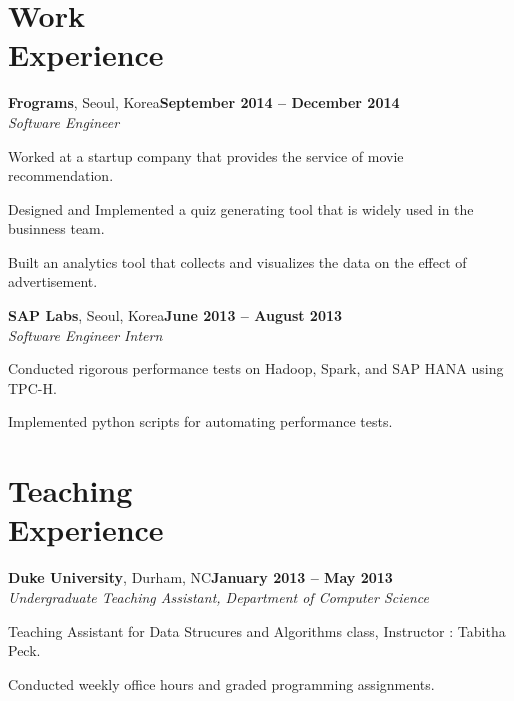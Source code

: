 \documentclass[11pt,margin,line]{cv}
\begin{document}
\begin{resume}
    \section{\mysidestyle Work\\Experience}
    \textbf{Frograms}, Seoul, Korea\hfill \textbf{September 2014 -- December 2014} \vspace{1mm}\\\vspace{0mm}%
    \textsl{Software Engineer}
    \vspace{-2mm}\\\vspace{-1mm}%
    \begin{list3}
        \item Worked at a startup company that provides the service of movie recommendation.
        \item Designed and Implemented a quiz generating tool that is widely used in the businness team.
        \item Built an analytics tool that collects and visualizes the data on the effect of advertisement.
    \end{list3}

    \textbf{SAP Labs}, Seoul, Korea\hfill \textbf{June 2013 -- August 2013} \vspace{1mm}\\\vspace{0mm}%
    \textsl{Software Engineer Intern}
    \vspace{-2mm}\\\vspace{-1mm}%
    \begin{list3}
        \item Conducted rigorous performance tests on Hadoop, Spark, and SAP HANA using TPC-H.
        \item Implemented python scripts for automating performance tests.
    \end{list3}


    \section{\mysidestyle Teaching\\Experience}
    \textbf{Duke University}, Durham, NC\hfill \textbf{January 2013 -- May 2013} \vspace{1mm}\\\vspace{0mm}%
    \textsl{Undergraduate Teaching Assistant, Department of Computer Science}
    \vspace{-2mm}\\\vspace{-1mm}%
    \begin{list3}
        \item Teaching Assistant for Data Strucures and Algorithms class, Instructor : Tabitha Peck.
        \item Conducted weekly office hours and graded programming assignments.
    \end{list3}


\end{resume}
\end{document}
